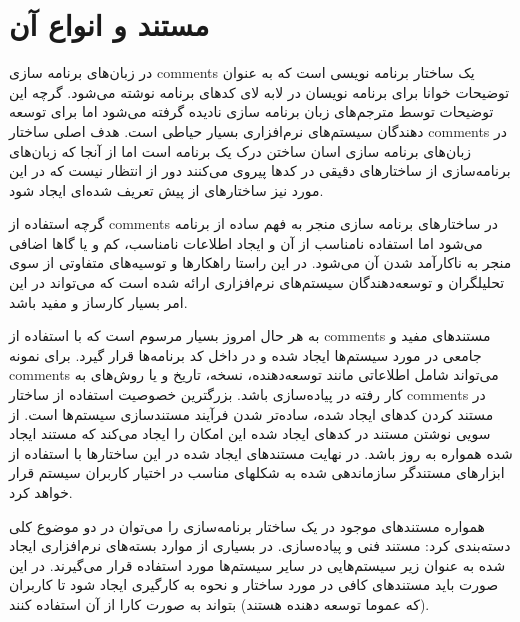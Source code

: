 %
% 
% 
% 
%
\section{مستند و انواع آن}

در زبان‌های برنامه سازی \glspl{comment} یک ساختار برنامه نویسی است که به عنوان
توضیحات خوانا برای برنامه نویسان در لابه لای کدهای برنامه نوشته می‌شود. گرچه این
توضیحات توسط مترجم‌های زبان برنامه سازی نادیده گرفته می‌شود اما برای توسعه
دهندگان سیستم‌های نرم‌افزاری بسیار حیاطی است. هدف اصلی ساختار \glspl{comment} در
زبان‌های برنامه سازی اسان ساختن درک یک برنامه است اما از آنجا که زبان‌های
برنامه‌سازی از ساختارهای دقیقی در کدها پیروی می‌کنند دور از انتظار نیست که در
این مورد نیز ساختارهای از پیش تعریف شده‌ای ایجاد شود.

گرچه استفاده از \glspl{comment} در ساختارهای برنامه سازی منجر به فهم ساده از
برنامه می‌شود اما استفاده نامناسب از آن و ایجاد اطلاعات نامناسب، کم و یا گاها
اضافی منجر به ناکارآمد شدن آن می‌شود. در این راستا راهکارها و توسیه‌های متفاوتی
از سوی تحلیلگران و توسعه‌دهندگان سیستم‌های نرم‌افزاری ارائه شده است که می‌تواند
در این امر بسیار کارساز و مفید باشد.

به هر حال امروز بسیار مرسوم است که با استفاده از \glspl{comment} مستندهای مفید و
جامعی در مورد سیستم‌ها ایجاد شده و در داخل کد برنامه‌ها قرار گیرد\cite{17wiki}.
برای نمونه \glspl{comment} می‌تواند شامل اطلاعاتی مانند توسعه‌دهنده، نسخه، تاریخ
و یا روش‌های به کار رفته در پیاده‌سازی باشد. بزرگترین خصوصیت استفاده از
ساختار \glspl{comment} در مستند کردن کدهای ایجاد شده، ساده‌تر شدن فرآیند
مستندسازی سیستم‌ها است. از سویی نوشتن مستند در کدهای ایجاد شده این امکان را
ایجاد می‌کند که مستند ایجاد شده همواره به روز باشد. در نهایت مستندهای ایجاد شده
در این ساختارها با استفاده از ابزارهای مستندگر سازماندهی شده به شکلهای مناسب در
اختیار کاربران سیستم قرار خواهد کرد.

همواره مستندهای موجود در یک ساختار برنامه‌سازی را می‌توان در دو موضوع کلی
دسته‌بندی کرد: مستند فنی و پیاده‌سازی. در بسیاری از موارد بسته‌های نرم‌افزاری
ایجاد شده به عنوان زیر سیستم‌هایی در سایر سیستم‌ها مورد استفاده قرار می‌گیرند.
در این صورت باید مستندهای کافی در مورد ساختار و نحوه به کارگیری ایجاد شود تا
کاربران (که عموما توسعه دهنده هستند) بتواند به صورت کارا از آن استفاده کنند.

